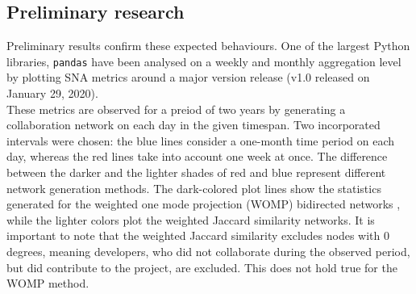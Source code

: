 
\subsection{Preliminary research}
Preliminary results confirm these expected behaviours. One of the largest Python libraries, \texttt{pandas} have been analysed on a weekly and monthly aggregation level by plotting  SNA metrics around a major version release (v1.0 released on January 29, 2020). \\


These metrics are observed for a preiod of two years by generating a collaboration network on each day in the given timespan. Two incorporated intervals were chosen: the blue lines consider a one-month time period on each day, whereas the red lines take into account one week at once. The difference between the darker and the lighter shades of red and blue represent different network generation methods. The dark-colored plot lines show the statistics generated for the weighted one mode projection (WOMP) bidirected networks \cite{stramWeightedOneMode2017}, while the lighter colors plot the weighted Jaccard similarity networks. It is important to note that the weighted Jaccard similarity excludes nodes with 0 degrees, meaning developers, who did not collaborate during the observed period, but did contribute to the project, are excluded. This does not hold true for the WOMP method. \\

